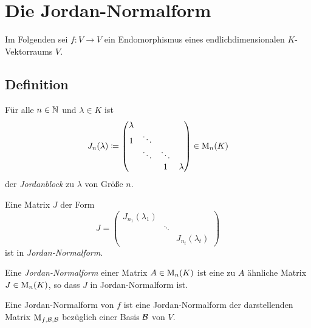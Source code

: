 \chapter{Die Jordan-Normalform}

Im Folgenden sei $f \colon V \to V$ ein Endomorphismus eines endlichdimensionalen $K$-Vek\-tor\-raums $V$.





\section{Definition}

\begin{definition}
  Für alle $n \in \mathbb{N}$ und $\lambda \in K$ ist
  \[
              J_n(\lambda)
    \coloneqq \begin{pmatrix}
                \lambda &         &         &         \\
                1       & \ddots  &         &         \\
                        & \ddots  & \ddots  &         \\
                        &         & 1       & \lambda
              \end{pmatrix}
    \in       \operatorname{M}_{n}(K)
  \]
  der \emph{Jordanblock} zu $\lambda$ von Größe $n$.
\end{definition}

\begin{definition}
  Eine Matrix $J$ der Form
  \[
      J
    = \begin{pmatrix}
        J_{n_1}(\lambda_1)  &         &                     \\
                            & \ddots  &                     \\
                            &         & J_{n_t}(\lambda_t)
      \end{pmatrix}
  \]
  ist in \emph{Jordan-Normalform}.
\end{definition}

\begin{definition}
  Eine \emph{Jordan-Normalform} einer Matrix $A \in \operatorname{M}_{n}(K)$ ist eine zu $A$ ähnliche Matrix $J \in \operatorname{M}_{n}(K)$, so dass $J$ in Jordan-Normalform ist.
  
  Eine Jordan-Normalform von $f$ ist eine Jordan-Normalform der darstellenden Matrix $\operatorname{M}_{f, \mathcal{B}, \mathcal{B}}$ bezüglich einer Basis $\mathcal{B}$ von $V$.
\end{definition}

